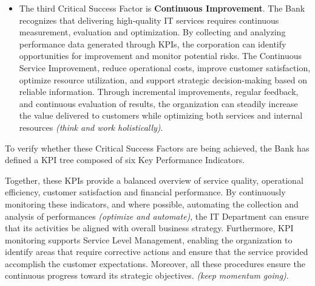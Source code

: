 \begin{itemize}
    
    \item The third Critical Success Factor is \textbf{Continuous Improvement}. The Bank recognizes that delivering high-quality IT services requires continuous measurement, evaluation and optimization. By collecting and analyzing performance data generated through KPIs, the corporation can identify opportunities for improvement and monitor potential risks.
    The Continuous Service Improvement, reduce operational costs, improve customer satisfaction, optimize resource utilization, and support strategic decision-making based on reliable information. Through incremental improvements, regular feedback, and continuous evaluation of results, the organization can steadily increase the value delivered to customers while optimizing both services and internal resources \textit{(think and work holistically)}.
\end{itemize}


To verify whether these Critical Success Factors are being achieved, the Bank has defined a KPI tree composed of six Key Performance Indicators.


Together, these KPIs provide a balanced overview of service quality, operational efficiency, customer satisfaction and financial performance.
By continuously monitoring these indicators, and where possible, automating the collection and analysis of performances \textit{(optimize and automate)}, the IT Department can ensure that its activities be aligned with overall business strategy.
Furthermore, KPI monitoring supports Service Level Management, enabling the organization to identify areas that require corrective actions and ensure that the service provided accomplish the customer expectations. Moreover, all these procedures ensure the continuous progress toward its strategic objectives. \textit{(keep momentum going)}.

